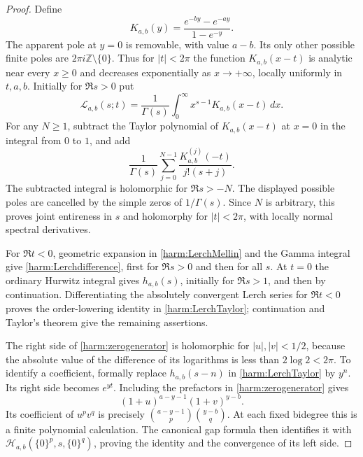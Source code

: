 \documentclass[11pt,a4paper]{article}
\numberwithin{equation}{section}
\theoremstyle{definition}
\theoremstyle{remark}
\begin{document}
\begin{proof}
Define
\begin{equation}
 K_{a,b}(y)=\frac{e^{-by}-e^{-ay}}{1-e^{-y}}.
 \label{harm:K}
\end{equation}
The apparent pole at $y=0$ is removable, with value $a-b$.
Its only other possible finite poles are $2\pi i\mathbb Z\setminus\{0\}$.
Thus for $|t|<2\pi$ the function $K_{a,b}(x-t)$ is analytic near
every $x\ge0$ and decreases exponentially as $x\to+\infty$,
locally uniformly in $t,a,b$. Initially for $\Re s>0$ put
\begin{equation}
 \mathcal L_{a,b}(s;t)=\frac1{\Gamma(s)}
                \int_0^\infty x^{s-1}K_{a,b}(x-t)\,dx.
 \label{harm:LerchMellin}
\end{equation}
For any $N\ge1$, subtract the Taylor polynomial of $K_{a,b}(x-t)$
at $x=0$ in the integral from $0$ to $1$, and add
\[
 \frac1{\Gamma(s)}\sum_{j=0}^{N-1}
             \frac{K_{a,b}^{(j)}(-t)}{j!(s+j)}.
\]
The subtracted integral is holomorphic for $\Re s>-N$. The displayed
possible poles are cancelled by the simple zeros of $1/\Gamma(s)$.
Since $N$ is arbitrary, this proves joint entireness in $s$ and
holomorphy for $|t|<2\pi$, with locally normal spectral derivatives.

For $\Re t<0$, geometric expansion in \eqref{harm:LerchMellin}
and the Gamma integral give \eqref{harm:Lerchdifference}, first for
$\Re s>0$ and then for all $s$. At $t=0$ the ordinary Hurwitz
integral gives $h_{a,b}(s)$, initially for $\Re s>1$, and then by
continuation. Differentiating the absolutely convergent Lerch series
for $\Re t<0$ proves the order-lowering identity in
\eqref{harm:LerchTaylor}; continuation and Taylor's theorem give the
remaining assertions.

The right side of \eqref{harm:zerogenerator} is holomorphic for
$|u|,|v|<1/2$, because the absolute value of the difference of its
logarithms is less than $2\log2<2\pi$. To identify a coefficient,
formally replace $h_{a,b}(s-n)$ in \eqref{harm:LerchTaylor} by
$y^n$. Its right side becomes $e^{yt}$. Including the prefactors in
\eqref{harm:zerogenerator} gives
\[
                 (1+u)^{a-y-1}(1+v)^{y-b}.
\]
Its coefficient of $u^pv^q$ is precisely
$\binom{a-y-1}{p}\binom{y-b}{q}$. At each fixed bidegree this is a
finite polynomial calculation. The canonical gap formula then identifies
it with $\mathcal H_{a,b}(\{0\}^p,s,\{0\}^q)$, proving the
identity and the convergence of its left side.
\end{proof}
\end{document}
